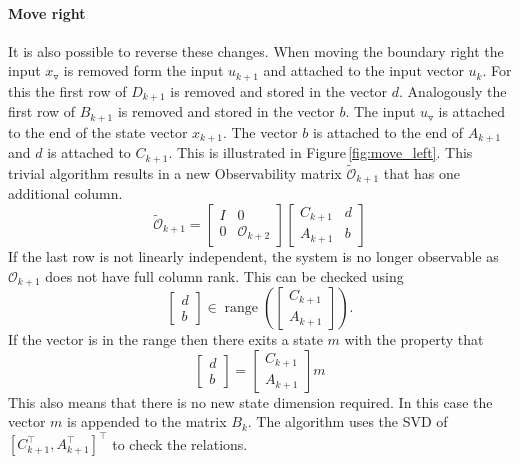 \documentclass[doctype=mastersthesis,BCOR=15mm,biblatex]{ldvbook}%
\DeclareMathOperator{\range}{range}
\newcommand{\Ob}{\mathcal{O}} %
\newcommand{\eye}{I} %
\newcommand{\m}{\triangledown} %
\begin{document}
\paragraph{Move right}
It is also possible to reverse these changes.
When moving the boundary right the input $x_\m$ is removed form the input $u_{k+1}$ and attached to the input vector $u_k$.
For this the first row of $D_{k+1}$ is removed and stored in the vector $d$. Analogously the first row of $B_{k+1}$ is removed and stored in the vector $b$.
The input $u_\m$ is attached to the end of the state vector $x_{k+1}$.
The vector $b$ is attached to the end of $A_{k+1}$ and $d$ is attached to $C_{k+1}$.
This is illustrated in Figure\,\ref{fig:move_left}.
This trivial algorithm results in a new Observability matrix $\tilde{\Ob}_{k+1}$ that has one additional column.
\begin{equation}
	\tilde{\Ob}_{k+1}
	=
	\begin{bmatrix}
	\eye & 0\\ 0 &\Ob_{k+2}
	\end{bmatrix}
	\begin{bmatrix}
	C_{k+1} & d\\
	A_{k+1} & b
	\end{bmatrix}
\end{equation}
If the last row is not linearly independent, the system is no longer observable as $\Ob_{k+1}$ does not have full column rank.
This can be checked using
\begin{equation}
	\begin{bmatrix}
	d\\b
	\end{bmatrix}
	\in
	\range\left(
	\begin{bmatrix}
	C_{k+1}\\A_{k+1}
	\end{bmatrix}\right).
\end{equation}
If the vector is in the range then there exits a state $m$ with the property that
\begin{equation}
	\begin{bmatrix}
	d\\b
	\end{bmatrix}
	=
	\begin{bmatrix}
	C_{k+1}\\A_{k+1}
	\end{bmatrix}
	m
\end{equation}
This also means that there is no new state dimension required.
In this case the vector $m$ is appended to the matrix $B_{k}$.
The algorithm uses the SVD of $[C_{k+1}^\top,A_{k+1}^\top]^\top$ to check the relations.
\end{document}
